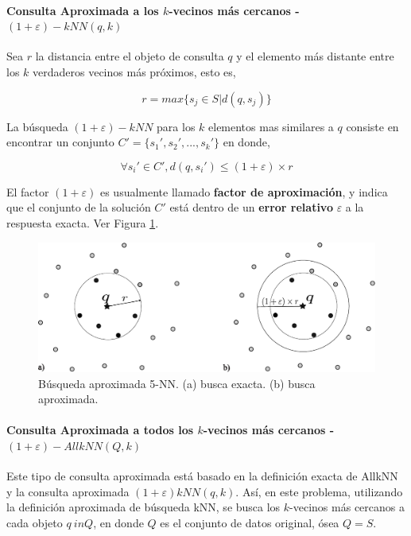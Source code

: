 \paragraph{Consulta Aproximada a los $k$-vecinos más cercanos  - $(1 + \varepsilon) - kNN(q, k)$}
Sea $r$ la distancia entre el objeto de consulta $q$ y el elemento más distante entre los $k$ verdaderos vecinos más próximos, esto es,

\begin{equation}
r = max\{ s_j \in S | d(q, s_j)\}
\end{equation}

La búsqueda $(1 + \varepsilon)-kNN$  para los $k$ elementos  mas similares a $q$ consiste en encontrar un conjunto $C' = \{s_1', s_2', ..., s_k'\}$ en donde,

\begin{equation}
\forall s_i' \in C', d(q, s_i') \leq (1 + \varepsilon) \times r
\end{equation}

El factor $(1 + \varepsilon)$  es usualmente llamado  \textbf{factor de aproximación}, y indica que el conjunto de la solución $C'$ está dentro de un \textbf{error relativo}  $\varepsilon$  a la respuesta exacta.  Ver Figura \ref{fig:nearbyKnnQuery}.
\begin{figure}[htp]
\centering
\includegraphics[width=0.85\columnwidth]{images/nearby_knn_query.pdf}
\caption{Búsqueda aproximada 5-NN. (a) busca exacta. (b) busca aproximada.  }
\label{fig:nearbyKnnQuery}
\end{figure}


\paragraph{Consulta Aproximada a todos los $k$-vecinos más cercanos - $(1 + \varepsilon) - AllkNN(Q, k)$}

Este tipo de consulta aproximada está basado en la definición exacta de AllkNN y la consulta aproximada $(1 + \varepsilon)  kNN(q, k)$. Así, en este problema, utilizando la definición aproximada de búsqueda kNN, se busca los $k$-vecinos más cercanos a cada objeto $q \ in Q$, en donde $Q$ es el conjunto de datos original, ósea $Q = S$.


